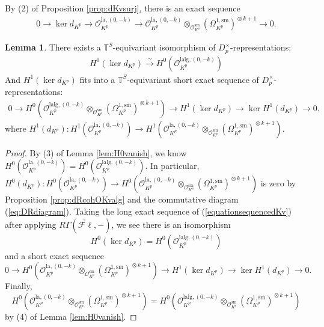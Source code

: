 \documentclass{article}
\theoremstyle{definition}
\newtheorem{lemma}[theorem]{Lemma}
\def\calO{\mathcal{O}}
\def\bbT{\mathbb{T}}
\DeclareMathOperator{\ox}{\otimes}
\def\lan{\mathrm{la}}
\def\sm{\mathrm{sm}}
\def\lalg{\mathrm{lalg}}
\def\fl{\mathscr{F}\ell}
\begin{document}
By (2) of Proposition \ref{prop:dKvsurj}, there is an exact sequence 
\begin{align}\label{equationsequencedKv}
    0\to \ker d_{K^p}\to \calO_{K^p}^{\lan,(0,-k)}\to \calO_{K^p}^{\lan,(0,-k)}\ox_{\calO_{K^p}^{\sm}}(\Omega_{K^p}^{1,\sm})^{\ox k+1}\to 0.
\end{align}
\begin{lemma}\label{lem:cohoexactseqdKv}
    There exists a $\bbT^S$-equivariant isomorphism of $D_p^{\times}$-representations:
    \begin{align*}
        H^0(\ker d_{K^p})\stackrel{\sim}{\rightarrow} H^0(\calO_{K^p}^{\lalg,(0,-k)}) 
    \end{align*}
    And $H^1(\ker d_{K^p})$ fits into a $\bbT^S$-equivariant short exact sequence of $D_p^{\times}$-representations:
    \begin{align*}
        0\to H^0(\calO_{K^p}^{\lalg,(0,-k)}\ox_{\calO_{K^p}^{\sm}}(\Omega_{K^p}^{1,\sm})^{\ox k+1}) \to H^1(\ker d_{K^p}) \to \ker H^1(d_{K^p})\to 0.
    \end{align*}
    where $ H^1(d_{K^p}):H^1(\calO_{K^p}^{\lan,(0,-k)})\to H^1(\calO_{K^p}^{\lan,(0,-k)}\ox_{\calO_{K^p}^{\sm}}(\Omega_{K^p}^{1,\sm})^{\ox k+1})$.
\end{lemma}
\begin{proof}
    By (3) of Lemma \ref{lem:H0vanish}, we know $H^0(\calO_{K^p}^{\lan,(0,-k)})=H^0(\calO_{K^p}^{\lalg,(0,-k)})$. In particular, $H^0(d_{K^p}):H^0(\calO_{K^p}^{\lan,(0,-k)})\to H^0(\calO_{K^p}^{\lan,(0,-k)}\ox_{\calO_{K^p}^{\sm}}(\Omega_{K^p}^{1,\sm})^{\ox k+1})$ is zero by Proposition \ref{prop:dRcohOKvalg} and the commutative diagram (\ref{eq:DRdiagram}).
    Taking the long exact sequence of (\ref{equationsequencedKv}) after applying $R\Gamma(\check{\fl},-)$, we see there is an isomorphism
    \[H^0(\ker d_{K^p})=H^0(\calO_{K^p}^{\lalg,(0,-k)})\]
    and a short exact sequence
    \[0\rightarrow H^0(\calO_{K^p}^{\lan,(0,-k)}\ox_{\calO_{K^p}^{\sm}}(\Omega_{K^p}^{1,\sm})^{\ox k+1})\rightarrow H^1(\ker d_{K^p})\rightarrow \ker H^1(d_{K^p})\rightarrow 0.\]
    Finally,
    \[H^0(\calO_{K^p}^{\lan,(0,-k)}\ox_{\calO_{K^p}^{\sm}}(\Omega_{K^p}^{1,\sm})^{\ox k+1})=H^0(\calO_{K^p}^{\lalg,(0,-k)}\ox_{\calO_{K^p}^{\sm}}(\Omega_{K^p}^{1,\sm})^{\ox k+1})\] 
    by (4) of Lemma \ref{lem:H0vanish}. 
\end{proof}
\end{document}
